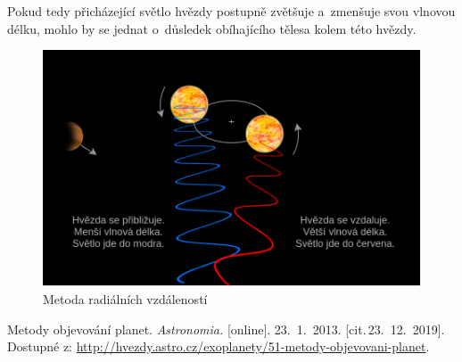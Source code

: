 \documentclass[a4paper,12pt]{article}
\begin{document}
Pokud tedy přicházející světlo hvězdy postupně zvětšuje a~zmenšuje svou vlnovou délku, mohlo by se jednat o~důsledek obíhajícího tělesa kolem této hvězdy.

\begin{figure}[!htb]
\begin{center}
\includegraphics[width=\textwidth]{img/radial_velocity.png}
\caption[Metoda radiálních vzdáleností]{Metoda radiálních vzdáleností \footnotemark[1]}
\end{center}
\end{figure}




\clearpage {} {}

\begin{thebibliography}{99}	%


Metody objevování planet.
\textit{Astronomia.} [online]. 23.~1.~2013. [cit.\,23.~12.~2019].
Dostupné z: {\ttfamily \url{http://hvezdy.astro.cz/exoplanety/51-metody-objevovani-planet}}.

\end{thebibliography}

\end{document}
